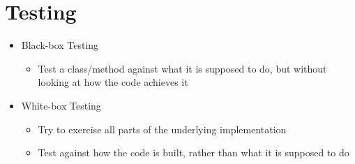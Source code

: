 \documentclass[12pt]{article}
\begin{document}
\section{Testing}
\begin{itemize}
    \item Black-box Testing
        \begin{itemize}
            \item Test a class/method against what it is supposed to do, but
            without looking at how the code achieves it
        \end{itemize}
    \item White-box Testing
        \begin{itemize}
            \item Try to exercise all parts of the underlying implementation
            \item Test against how the code is built, rather than what it is supposed to do
        \end{itemize}
\end{itemize}
\end{document}
